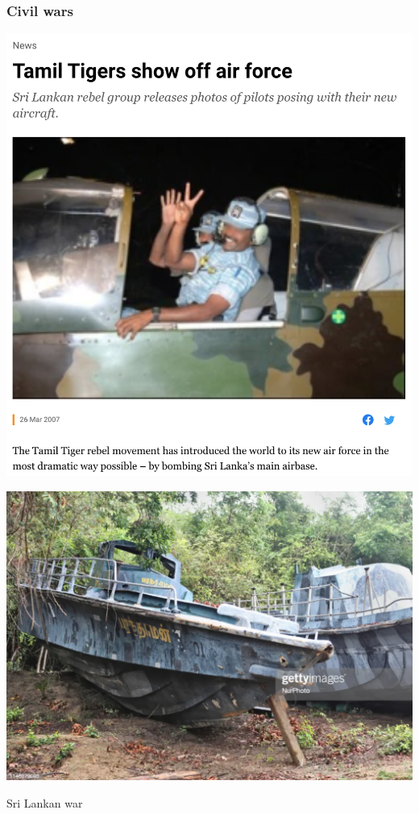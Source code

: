 \documentclass[aspectratio=43]{beamer}
\begin{document}
\begin{frame}
\frametitle{Civil wars}
\centering

\begin{minipage}{0.49\textwidth}\centering
\includegraphics[width = \textwidth]{img/tigers}
\end{minipage}\hfill
\begin{minipage}{0.49\textwidth}\centering
\includegraphics[width = \textwidth]{img/tigersnavy}
\end{minipage}

Sri Lankan war

\end{frame}
\end{document}
